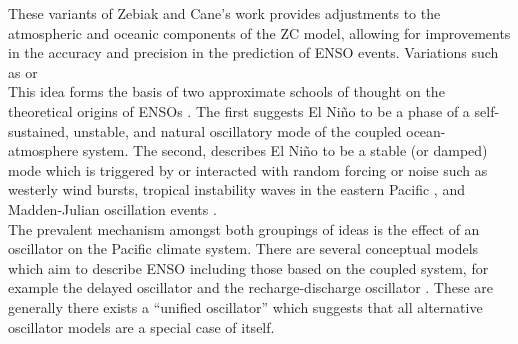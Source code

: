 \documentclass[12pt, onecolumn]{revtex4}    %
\begin{document}
These variants of Zebiak and Cane's work provides adjustments to the atmospheric and oceanic components of the ZC model, allowing for improvements in the accuracy and precision in the prediction of ENSO events. Variations such as \cite{Neelin:1991aa} or \cite{Neelin:1998aa}  \\

This idea forms the basis of two approximate schools of thought on the theoretical origins of ENSOs \citep{wang2017nino}. The first suggests El Ni\~{n}o to be a phase of a self-sustained, unstable, and natural oscillatory mode of the coupled ocean-atmosphere system. The second, describes El Ni\~{n}o to be a stable (or damped) mode which is triggered by or interacted with random forcing or noise such as westerly wind bursts, tropical instability waves in the eastern Pacific \citep{An:2008aa}, and Madden-Julian oscillation events \citep{doi:10.1175/JAS4029.1}.  \\

The prevalent mechanism amongst both groupings of ideas is the effect of an oscillator on the Pacific climate system. There are several conceptual models which aim to describe ENSO including those based on the coupled system, for example the delayed oscillator \citep{Suarez:1988aa, Battisti:1988aa} and the recharge-discharge oscillator \citep{Jin:1997aa}. These are generally there exists a ``unified oscillator'' \citep{Wang:2001aa} which suggests that all alternative oscillator models are a special case of itself. \\



\newpage

\nocite{ruddiman_climate}


\end{document}
